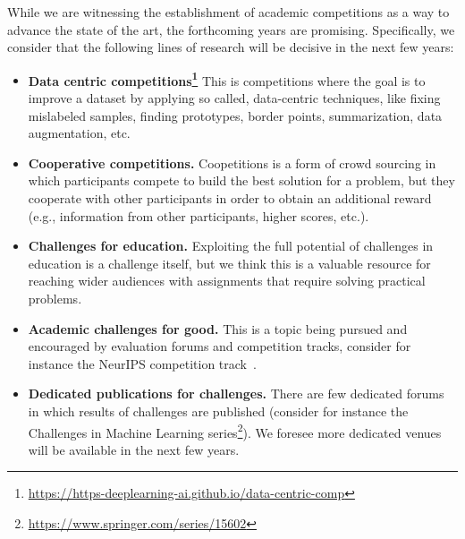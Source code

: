 \documentclass[twoside,11pt]{article}
\begin{document}
While we are witnessing the establishment of academic competitions as a way to advance the state of the art, the forthcoming years are promising. Specifically, we consider that the following lines of research will be decisive in the next few years:
\begin{itemize}
    \item \textbf{Data centric competitions\footnote{\url{https://https-deeplearning-ai.github.io/data-centric-comp}}} This is competitions where the goal is to improve a dataset by applying so called, data-centric techniques, like fixing mislabeled samples, finding prototypes, border points, summarization, data augmentation, etc. 
    \item \textbf{Cooperative competitions.} Coopetitions is a form of crowd sourcing in which participants compete to build the best solution for a problem, but they cooperate with other participants in order to obtain an additional reward (e.g., information from other participants, higher scores, etc.).
    \item \textbf{Challenges for education.} Exploiting the full potential of challenges in education is a challenge itself, but we think this is  a valuable resource for reaching wider audiences with assignments that require solving practical problems.
    \item \textbf{Academic challenges for good.} This is a topic being pursued and encouraged by evaluation forums and competition tracks, consider for instance the NeurIPS competition track~\citep{DBLP:conf/nips/EscalanteH19,DBLP:conf/nips/EscalanteH20,pmlr-v176-kiela22a}. 
    \item \textbf{Dedicated publications for challenges.} There are few dedicated forums in which results of challenges are published (consider for instance the Challenges in Machine Learning series\footnote{\url{https://www.springer.com/series/15602}}). We foresee more dedicated venues will be available in the next few years.   
\end{itemize}




\end{document}
